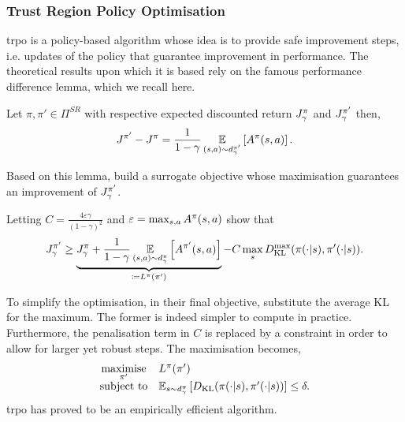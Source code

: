 \subsubsection{Trust Region Policy Optimisation}
\gls{trpo}\cite{schulman2015trust} is a policy-based algorithm whose idea is to provide safe improvement steps, i.e. updates of the policy that guarantee improvement in performance.
The theoretical results upon which it is based rely on the famous performance difference lemma, which we recall here.
\begin{lemma}
    Let $\pi,\pi'\in\Pi^{SR}$ with respective expected discounted return $\expectedreturn[\gamma][\pi]$ and $\expectedreturn[\gamma][\pi']$ then,
    \begin{align*}
        \expectedreturn[][\pi'] - \expectedreturn[][\pi] = \frac{1}{1-\gamma}\expectedvalue_{(s,a)\sim\discountedstateoccupancydistribution[\gamma][\pi']}\left[\advantagefunction^{\pi}(s,a)\right].
    \end{align*}
\end{lemma}

Based on this lemma, \cite{schulman2015trust} build a surrogate objective whose maximisation guarantees an improvement of $\expectedreturn[\gamma][\pi']$.

Letting $\textstyle C=\frac{4\varepsilon\gamma}{(1-\gamma)^2}$ and $\varepsilon=\max_{s,a}A^\pi(s,a)$ \cite{schulman2015trust} show that 
\begin{align*}
    \expectedreturn[\gamma][\pi'] \ge \underbrace{\expectedreturn[\gamma][\pi] + \frac{1}{1-\gamma}\expectedvalue_{(s,a)\sim\discountedstateoccupancydistribution[\gamma]}\left[\advantagefunction^{\pi'}(s,a)\right]}_{\coloneq L^\pi(\pi')} - C \max_s \kullbackleiblerdivergence^{\max} (\pi(\cdot\vert s),\pi'(\cdot\vert s)).
\end{align*}

To simplify the optimisation, in their final objective, \cite{schulman2015trust} substitute the average KL for the maximum. 
The former is indeed simpler to compute in practice.
Furthermore, the penalisation term in $C$ is replaced by a constraint in order to allow for larger yet robust steps.
The maximisation becomes,
\begin{align*}
\begin{array}{cl}
     \underset{\pi'}{\text{maximise}} &  L^\pi(\pi')\\
     \text{subject to} & \expectedvalue_{s\sim \discountedstateoccupancydistribution[\gamma][\pi]}\left[ \kullbackleiblerdivergence (\pi(\cdot\vert s),\pi'(\cdot\vert s))\right]\le \delta.
\end{array}
\end{align*}
\gls{trpo} has proved to be an empirically efficient algorithm. 


